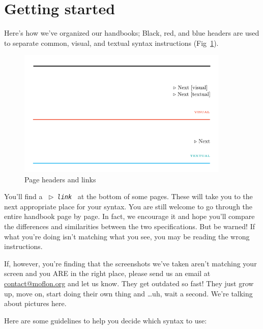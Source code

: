 \section{Getting started}
\genHeader 

Here's how we've organized our handbooks; Black, red, and blue headers are used to separate common, visual, and textual syntax
instructions (Fig~\ref{pageExamples}).

\begin{figure}[htbp] \centering
  \includegraphics[width=0.9\textwidth]{headers}
	\caption{Page headers and links}
	\label{pageExamples} 
\end{figure}

You'll find a \mbox{ $\triangleright$ {\texttt {\emph{link}}} } at the bottom of some pages. These will take you to the next appropriate place for your syntax.
You are still welcome to go through the entire handbook page by page. In fact, we encourage it and hope you'll compare the differences and similarities
between the two specifications. But be warned! If what you're doing isn't matching what you see, you may be reading the wrong instructions.

If, however, you're finding that the screenshots we've taken aren't matching your screen and you ARE in the right place, please send us an email at
\href{mailto:contact@moflon.org}{contact@moflon.org} and let us know. They get outdated so fast! They just grow up, move on, start doing their own thing and
\ldots uh, wait a second. We're talking about pictures here.

Here are some guidelines to help you decide which syntax to use:

